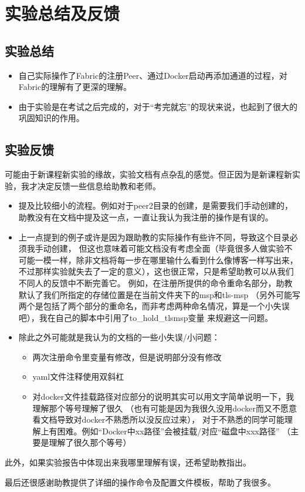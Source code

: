 \documentclass{article}
\begin{document}
    \section{实验总结及反馈}
    \subsection{实验总结}
    \begin{itemize}
        \item 自己实际操作了Fabric的注册Peer、通过Docker启动再添加通道的过程，对Fabric的理解有了更深的理解。
        \item 由于实验是在考试之后完成的，对于``考完就忘''的现状来说，也起到了很大的巩固知识的作用。
    \end{itemize}
    \subsection{实验反馈}
    可能由于新课程新实验的缘故，实验文档有点杂乱的感觉。但正因为是新课程新实验，我才决定反馈一些信息给助教和老师。
    \begin{itemize}
        \item 提及比较细小的流程。例如对于{\jetbrains peer2}目录的创建，是需要我们手动创建的，
        助教没有在文档中提及这一点，一直让我认为我注册的操作是有误的。
        \item 上一点提到的例子或许是因为跟助教的实际操作有些许不同，导致这个目录必须我手动创建，
        但这也意味着可能文档没有考虑全面（毕竟很多人做实验不可能一模一样，除非文档将每一步在哪里输什么看到什么像博客一样写出来，
        不过那样实验就失去了一定的意义），这也很正常，只是希望助教可以从我们不同人的反馈中不断完善它。
        例如，在注册所提供的命令重命名部分，助教默认了我们所指定的存储位置是在当前文件夹下的{\jetbrains msp}和{\jetbrains tls-msp}
        （另外可能写两个是包括了两个部分的重命名，而非考虑两种命名情况，算是一个小失误吧），我在自己的脚本中引用了{\jetbrains to\_hold\_tlsmsp}变量
        来规避这一问题。
        \item 除此之外可能就是我认为的文档的一些小失误/小问题：
        \begin{itemize}
            \item 两次注册命令里变量有修改，但是说明部分没有修改
            \item yaml文件注释使用双斜杠
            \item 对docker文件挂载路径对应部分的说明其实可以用文字简单说明一下，我理解那个等号理解了很久
            （也有可能是因为我很久没用docker而又不愿意看文档导致对docker不熟悉所以没反应过来），
            对于不熟悉的同学可能理解上有困难。例如``Docker中xx路径''会被挂载/对应``磁盘中xxx路径''
            （主要是理解了很久那个等号）
        \end{itemize}
    \end{itemize}
    
    此外，如果实验报告中体现出来我哪里理解有误，还希望助教指出。
    
    最后还很感谢助教提供了详细的操作命令及配置文件模板，帮助了我很多。
\end{document}
